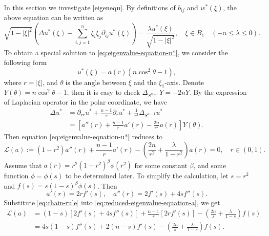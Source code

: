 \documentclass[reqno]{amsart}
\theoremstyle{remark}
\theoremstyle{definition}
\numberwithin{equation}{section}
\begin{document}
In this section we investigate \eqref{eigenequ}. By definitions of \(b_{ij}\) and \(w^*(\xi)\), the above equation can be written as  
\begin{equation}\label{eq:eigenvalue-equation-u*}
    \sqrt{1-|\xi|^2}\left(\Delta u^*(\xi) - \sum_{i,j=1}^{n}\xi_i \xi_j \partial_{ij}u^*(\xi)\right) = \frac{\lambda u^*(\xi)}{\sqrt{1-|\xi|^2}}, \quad \xi\in B_1 \quad(-n \leqslant \lambda \leqslant 0).
\end{equation}
To obtain a special solution to \eqref{eq:eigenvalue-equation-u*}, we consider the following form 
\begin{equation}\label{eq:expected-form}
    u^*(\xi) = a(r)(n\cos^2\theta - 1),
\end{equation}
where \(r = |\xi|\), and \(\theta\) is the angle between \(\xi\) and the \(\xi_1\)-axis. Denote \(Y(\theta) = n\cos^2\theta - 1\), then it is easy to check \(\Delta_{S^{n-1}}Y = -2n Y\). By the expression of Laplacian operator in the polar coordinate, we have 
\[\begin{aligned} 
    \Delta u^* &= \partial_{rr}u^* + \frac{n-1}{r}\partial_{r}u^* + \frac{1}{r^2}\Delta_{S^{n-1}}u^* \\
    &= \left[a''(r) + \frac{n-1}{r}a'(r) - \frac{2n}{r^2}a(r)\right]Y(\theta).
\end{aligned} \]
Then equation \eqref{eq:eigenvalue-equation-u*} reduces to 
\begin{equation}\label{eq:reduced-eigenvalue-equation-a}
    \mathcal{L}(a) := (1-r^2)a''(r) + \frac{n-1}{r}a'(r) - \left( \frac{2n}{r^2} + \frac{\lambda}{1-r^2} \right)a(r) = 0, \quad r\in (0,1).
\end{equation}
Assume that \(a(r) = r^2(1-r^2)^\beta \phi(r^2)\) for some constant \(\beta\), and some function \(\phi = \phi(s)\) to be determined later. To simplify the calculation, let \(s = r^2\) and \(f(s) = s(1-s)^\beta \phi(s)\). Then  
\begin{equation}\label{eq:chain-rule}
    a'(r) = 2rf'(s), \quad a''(r) = 2f'(s) + 4s f''(s). 
\end{equation} 
Substitute \eqref{eq:chain-rule} into \eqref{eq:reduced-eigenvalue-equation-a}, we get 
\begin{equation}\label{eq:La-1}
\begin{aligned}
    \mathcal{L}(a) &= (1-s)\left[2f'(s) + 4sf''(s)\right] + \frac{n-1}{r}\left[2r f'(s)\right] - \left( \frac{2n}{s} + \frac{\lambda}{1-s} \right)f(s) \\
    &= 4s(1-s)f''(s) + 2(n-s)f'(s) - \left( \frac{2n}{s} + \frac{\lambda}{1-s} \right)f(s).    
\end{aligned}
\end{equation} 
\end{document}
